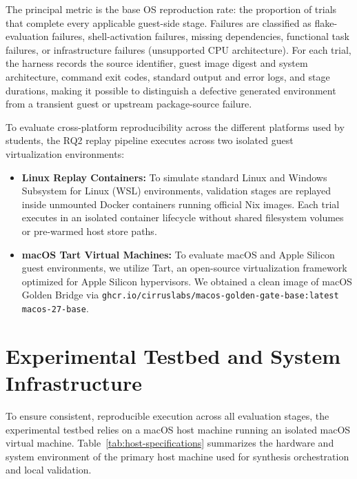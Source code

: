 The principal metric is the base OS reproduction rate: the proportion of trials that
complete every applicable guest-side stage. Failures are classified as flake-evaluation
failures, shell-activation failures, missing dependencies, functional task failures,
or infrastructure failures (unsupported CPU architecture). For each trial, the
harness records the source identifier, guest image digest and system architecture,
command exit codes, standard output and error logs, and stage durations, making it
possible to distinguish a defective generated environment from a transient guest or
upstream package-source failure.

To evaluate cross-platform reproducibility across the different platforms used by
students, the RQ2 replay pipeline executes across two isolated guest
virtualization environments:
\begin{itemize}
	\item \textbf{Linux Replay Containers:} To simulate standard Linux and
	      Windows Subsystem for Linux (WSL) environments, validation stages are replayed
	      inside unmounted Docker containers running official Nix images. Each
	      trial executes in an isolated container lifecycle without shared
	      filesystem volumes or pre-warmed host store paths.

	\item \textbf{macOS Tart Virtual Machines:} To evaluate macOS and Apple
	      Silicon guest environments, we utilize Tart, an open-source
	      virtualization framework optimized for Apple Silicon hypervisors. We obtained
	      a clean image of macOS Golden Bridge via \texttt{ghcr.io/cirruslabs/macos-golden-gate-base:latest
		      macos-27-base}.
\end{itemize}

\section{Experimental Testbed and System Infrastructure}
\label{sec:testbed-infrastructure}

To ensure consistent, reproducible execution across all evaluation stages, the
experimental testbed relies on a macOS host machine running an isolated macOS
virtual machine. Table~\ref{tab:host-specifications} summarizes the hardware and system
environment of the primary host machine used for synthesis orchestration and local
validation.

